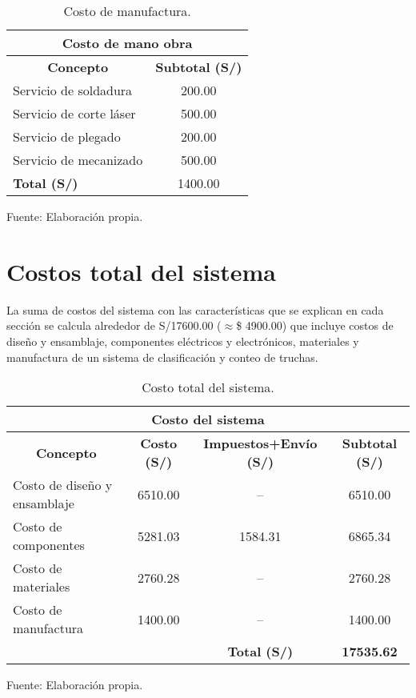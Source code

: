 \begin{table}[H]
	\footnotesize\centering
	\caption{Costo de manufactura.}
	\label{tab:costo de manufactura}
	\begin{tabular}{l|c|}
		\hline
		\multicolumn{2}{|c|}{\textbf{Costo de mano obra}}  \\ \hline
		\multicolumn{1}{|c|}{\textbf{Concepto}} & \multicolumn{1}{c|}{\textbf{Subtotal (S/)}} \\ \hline
		\multicolumn{1}{|l|}{Servicio de soldadura} & 200.00 \\ \hline
		\multicolumn{1}{|l|}{Servicio de corte láser} & 500.00 \\ \hline
		\multicolumn{1}{|l|}{Servicio de plegado} & 200.00 \\ \hline
		\multicolumn{1}{|l|}{Servicio de mecanizado} & 500.00 \\ \hline
		\multicolumn{1}{|l|}{\textbf{Total (S/)}} &  1400.00 \\ \hline
	\end{tabular}
	\begin{myflushcenteraftertable}	
		Fuente: Elaboración propia.
	\end{myflushcenteraftertable}
\end{table}

\section{Costos total del sistema}

La suma de costos del sistema con las características que se explican en cada sección se calcula alrededor de S/17600.00 ($\approx$\$ 4900.00) que incluye costos de diseño y ensamblaje, componentes eléctricos y electrónicos, materiales y manufactura de un sistema de clasificación y conteo de truchas.

\begin{table}[H]
	\footnotesize\centering
	\caption{Costo total del sistema.}
	\label{tab:costo total del sistema}
	\begin{tabular}{lc|c|c|}
		\hline
		\multicolumn{4}{|c|}{\textbf{Costo del sistema}}  \\ \hline
		\multicolumn{1}{|c|}{\textbf{Concepto}} & \multicolumn{1}{c|}{\textbf{Costo (S/)}} & \multicolumn{1}{c|}{\textbf{Impuestos+Envío (S/)}} & \multicolumn{1}{c|}{\textbf{Subtotal (S/)}} \\ \hline
		\multicolumn{1}{|l|}{Costo de diseño y ensamblaje} & 6510.00 & -- & 6510.00 \\ \hline
		\multicolumn{1}{|l|}{Costo de componentes} & 5281.03 & 1584.31 & 6865.34 \\ \hline
		\multicolumn{1}{|l|}{Costo de materiales} & 2760.28 & -- & 2760.28 \\ \hline
		\multicolumn{1}{|l|}{Costo de manufactura} & 1400.00 & -- & 1400.00 \\ \hline
		& & \textbf{Total (S/)} & \textbf{17535.62}  \\ \cline{3-4} 
	\end{tabular}
	\begin{myflushcenteraftertable}	
		Fuente: Elaboración propia.
	\end{myflushcenteraftertable}
\end{table}
